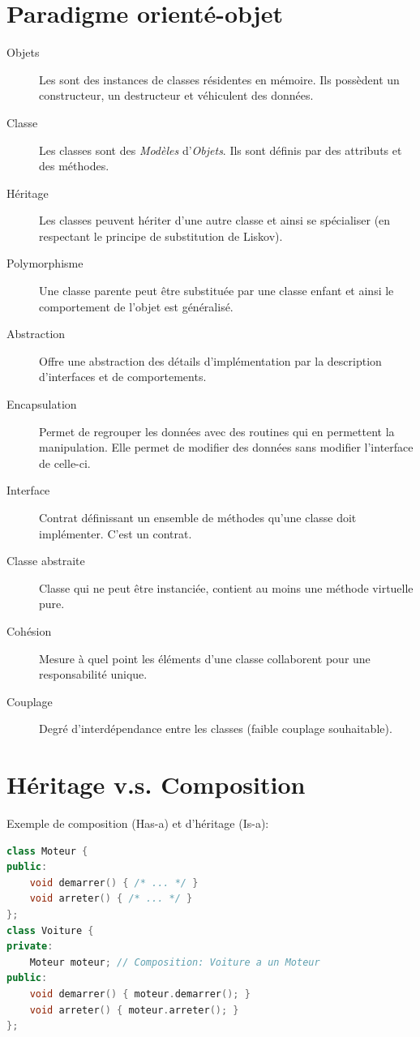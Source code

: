 \documentclass{article}
\begin{document}
\begin{multicols*}{3}
\section*{Paradigme orienté-objet}
\begin{description}
\item[Objets] Les sont des instances de classes résidentes en mémoire. Ils possèdent un constructeur, un destructeur et véhiculent des données.
\item[Classe] Les classes sont des \emph{Modèles} d'\emph{Objets}. Ils sont définis par des attributs et des méthodes.
\item[Héritage] Les classes peuvent hériter d'une autre classe et ainsi se spécialiser (en respectant le principe de substitution de Liskov).
\item[Polymorphisme] Une classe parente peut être substituée par une classe enfant et ainsi le comportement de l'objet est généralisé.
\item[Abstraction] Offre une abstraction des détails d'implémentation par la description d'interfaces et de comportements.
\item[Encapsulation] Permet de regrouper les données avec des routines qui en permettent la manipulation. Elle permet de modifier des données sans modifier l'interface de celle-ci.
\item[Interface] Contrat définissant un ensemble de méthodes qu'une classe doit implémenter. C'est un contrat.
\item[Classe abstraite] Classe qui ne peut être instanciée, contient au moins une méthode virtuelle pure.
\item[Cohésion] Mesure à quel point les éléments d'une classe collaborent pour une responsabilité unique.
\item[Couplage] Degré d'interdépendance entre les classes (faible couplage souhaitable).
\end{description}

\section*{Héritage v.s. Composition}
Exemple de composition (Has-a) et d'héritage (Is-a):
\begin{lstlisting}[language=C++]
class Moteur {
public:
    void demarrer() { /* ... */ }
    void arreter() { /* ... */ }
};
class Voiture {
private:
    Moteur moteur; // Composition: Voiture a un Moteur
public:
    void demarrer() { moteur.demarrer(); }
    void arreter() { moteur.arreter(); }
};


\end{lstlisting}
\end{multicols*}
\end{document}
